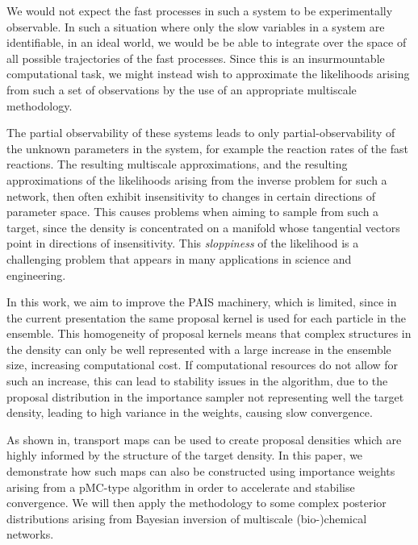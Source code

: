 \documentclass[final]{siamltex}
\begin{document}
We would not expect the fast processes in such a system to be
experimentally observable. In such a situation where only the slow
variables in a system are identifiable, in an ideal world, we would be
be able to integrate over the space of all possible trajectories of
the fast processes. Since this is an insurmountable computational
task, we might instead wish to approximate the likelihoods arising
from such a set of observations by the use of an appropriate
multiscale methodology.

The partial observability of these systems leads to only
partial-observability of the unknown parameters in the system, for
example the reaction rates of the fast reactions. The resulting
multiscale approximations, and the resulting approximations of the
likelihoods arising from the inverse problem for such a network, then
often exhibit 
insensitivity to changes in certain directions of
parameter space. This causes problems when aiming to sample from such
a target, since the density is concentrated on a manifold whose
tangential vectors point in directions of insensitivity. This
\emph{sloppiness}\cite{gutenkunst2007universally,apgar2010sloppy} of the likelihood is a challenging problem
that appears in many applications in science and engineering\cite{constantine2014active}.

In this work, we aim to improve the PAIS machinery, which is limited,
since in the current presentation the same proposal kernel is used for each particle in the
ensemble. This homogeneity of proposal kernels means that complex
structures in the density can only be well represented with a large
increase in the ensemble size, increasing computational cost. If
computational resources do not allow for such an increase, this can
lead to stability issues in the algorithm, due to the proposal
distribution in the importance sampler not representing well the
target density, leading to high variance in the weights, causing slow
convergence.

As shown in\cite{parno2014transport}, transport maps can be used to create
proposal densities which are highly informed by the structure of the
target density. In this paper, we demonstrate how such maps can also
be constructed using importance weights arising from a pMC-type
algorithm in order to accelerate and stabilise convergence. We will
then apply the methodology to some complex posterior distributions
arising from Bayesian inversion of multiscale (bio-)chemical networks.

\end{document}
